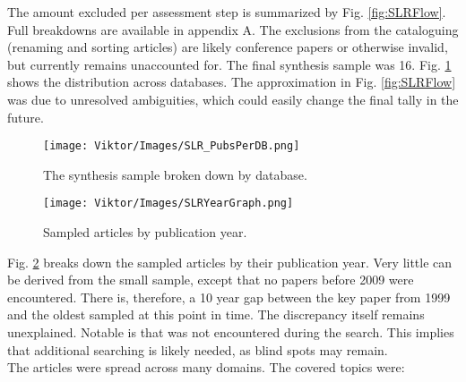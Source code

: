 \documentclass{article}
\begin{document}
\noindent The amount excluded per assessment step is summarized by Fig. \ref{fig:SLRFlow}. Full breakdowns are available in appendix A. The exclusions from the cataloguing (renaming and sorting articles) are likely conference papers or otherwise invalid, but currently remains unaccounted for. The final synthesis sample was 16. Fig. \ref{fig:SLRPubsPerDB} shows the distribution across databases. The approximation in Fig. \ref{fig:SLRFlow} was due to unresolved ambiguities, which could easily change the final tally in the future.

\begin{figure}[hb!]
\centering
\texttt{[image: Viktor/Images/SLR\_PubsPerDB.png]}
\caption{The synthesis sample broken down by database.}
\label{fig:SLRPubsPerDB}
\end{figure}


\begin{figure}[ht!]
\centering
\texttt{[image: Viktor/Images/SLRYearGraph.png]}
\caption{Sampled articles by publication year.}
\label{fig:SLRPubYears}
\end{figure}

\noindent Fig. \ref{fig:SLRPubYears} breaks down the sampled articles by their publication year. Very little can be derived from the small sample, except that no papers before 2009 were encountered. There is, therefore, a 10 year gap between the key paper from 1999 \cite{cohen1999} and the oldest sampled \cite{pudar2009} at this point in time. The discrepancy itself remains unexplained. Notable is that \cite{cohen1999} was not encountered during the search. This implies that additional searching is likely needed, as blind spots may remain.\\

\noindent The articles were spread across many domains. The covered topics were:
\end{document}
